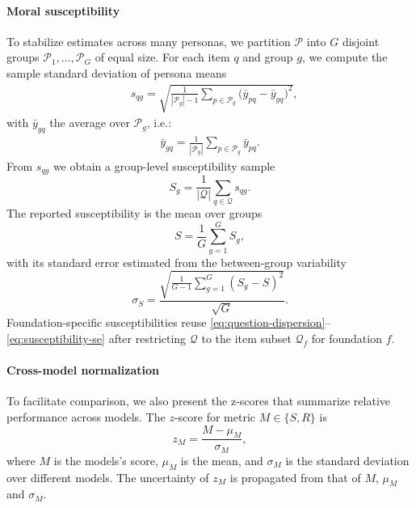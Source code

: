 \documentclass{article}
\begin{document}
\paragraph{Moral susceptibility} To stabilize estimates across many personas, we partition \(\mathcal{P}\) into \(G\) disjoint groups \(\mathcal{P}_1,\ldots,\mathcal{P}_G\) of equal size. For each item \(q\) and group \(g\), we compute the sample standard deviation of persona means
\begin{align}
  & s_{qg} = \sqrt{\frac{1}{|\mathcal{P}_g|-1} \sum_{p \in \mathcal{P}_g} \Big(\bar{y}_{pq} - \bar{y}_{gq}\Big)^2},
  \label{eq:question-dispersion}
\end{align}
with $\bar{y}_{gq}$ the average over $\mathcal{P}_g$, i.e.: 
\begin{align}
  \bar{y}_{gq} = \frac{1}{|\mathcal{P}_g|} \sum_{p \in \mathcal{P}_g} \bar{y}_{pq}.
\end{align}
From $s_{qg}$ we obtain a group-level susceptibility sample
\begin{equation}
  S_g = \frac{1}{|\mathcal{Q}|} \sum_{q \in \mathcal{Q}} s_{qg}.\label{eq:group-susceptibility}
\end{equation}
The reported susceptibility is the mean over groups
\begin{equation}
  S = \frac{1}{G} \sum_{g=1}^{G} S_g,\label{eq:overall-susceptibility}
\end{equation}
with its standard error estimated from the between-group variability
\begin{equation}
  \sigma_S = \frac{\sqrt{\frac{1}{G-1} \sum_{g=1}^{G} (S_g - S)^2}}{\sqrt{G}}.\label{eq:susceptibility-se}
\end{equation}
Foundation-specific susceptibilities reuse \eqref{eq:question-dispersion}--\eqref{eq:susceptibility-se} after restricting \(\mathcal{Q}\) to the item subset \(\mathcal{Q}_f\) for foundation \(f\).

\paragraph{Cross-model normalization} To facilitate comparison, we also present the z-scores that summarize relative performance across models. The $z$-score for metric $M\in \{S,R\}$ is
\begin{equation}
  z_{M} = \frac{M - \mu_M}{\sigma_M},
  \label{eq:zscore}
\end{equation}
where $M$ is the models's score, $\mu_M$ is the mean, and $\sigma_M$ is the standard deviation over different models. The uncertainty of $z_M$ is propagated from that of $M$, $\mu_M$ and $\sigma_M$.
\end{document}
